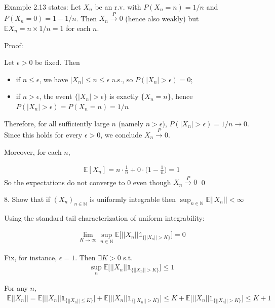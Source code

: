\documentclass[10pt]{article}
\begin{document}
Example 2.13 states: Let $X_n$ be an r.v. with $P(X_n = n) = 1 / n$ and $P(X_n = 0) = 1 - 1/n$. Then $X_n \xrightarrow{P} 0$ (hence also weakly) but $ \mathbb{E}X_n = n \times 1/ n = 1$ for each $n$.

Proof: 

Let $\epsilon > 0$ be fixed. Then 

\begin{itemize}
    \item if $n \leq \epsilon$, we have $|X_n| \leq n \leq \epsilon$ a.s., so $P(|X_n| > \epsilon) = 0$;
    \item if $n > \epsilon$, the event $\{|X_n| > \epsilon\}$ is exactly $\{X_n = n\}$, hence $P(|X_n| > \epsilon) = P(X_n = n) = 1/ n$
\end{itemize}

Therefore, for all sufficiently large $n$ (namely $n > \epsilon)$, $P(|X_n| > \epsilon) = 1 / n \to 0$. Since this holds for every $\epsilon > 0$, we conclude $X_n \xrightarrow{P} 0$.

Moreover, for each $n$,

\begin{gather*}
    \mathbb{E}[X_n] = n \cdot \frac{1}{n} + 0 \cdot \Big(1 - \frac{1}{n}\Big) = 1
\end{gather*}
So the expectations do not converge to 0 even though $X_n \xrightarrow{P} 0$ \qed

\newpage

8. Show that if $(X_n)_{n \in \mathbb{N}}$ is uniformly integrable then $\sup_{n \in \mathbb{N}}\mathbb{E}||X_n|| < \infty$

Using the standard tail characterization of uniform integrability: 

\begin{gather*}
    \lim_{K \to\infty}\sup_{n \in \mathbb{N}}\mathbb{E}\big[||X_n||\mathbb{1}_{\{||X_n|| > K\}}\big] = 0
\end{gather*}

Fix, for instance, $\epsilon = 1$. Then $\exists K > 0$ s.t.
\begin{gather*}
    \sup_n \mathbb{E}\big[||X_n||\mathbb{1}_{\{||X_n|| > K\}}\big] \leq 1
\end{gather*}

For any $n$,
\begin{gather*}
    \mathbb{E}||X_n|| = \mathbb{E}\big[||X_n||\mathbb{1}_{\{||X_n|| \leq K\}}\big] + \mathbb{E}\big[||X_n||\mathbb{1}_{\{||X_n|| > K\}}\big] \leq K + \mathbb{E}\big[||X_n||\mathbb{1}_{\{||X_n|| > K\}}\big] \leq K + 1
\end{gather*}
\end{document}
